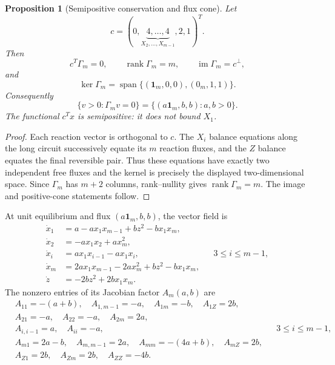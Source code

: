 \documentclass[11pt]{article}
\newtheorem{proposition}[theorem]{Proposition}
\theoremstyle{definition}
\newcommand{\im}{\operatorname{im}}
\newcommand{\rank}{\operatorname{rank}}
\newcommand{\1}{\mathbf 1}
\begin{document}
\begin{proposition}[Semipositive conservation and flux cone]\label{prop:flux}
Let
\begin{equation}\label{eq:cvec}
 c=(0,\underbrace{4,\ldots,4}_{X_2,\ldots,X_{m-1}},2,1)^T.
\end{equation}
Then
\begin{equation}\label{eq:rank-kernel}
 c^T\Gamma_m=0,\qquad \rank\Gamma_m=m,\qquad
 \im\Gamma_m=c^\perp,
\end{equation}
and
\begin{equation}\label{eq:kerGamma}
 \ker\Gamma_m=
 \operatorname{span}\{(\1_m,0,0),(0_m,1,1)\}.
\end{equation}
Consequently
\begin{equation}\label{eq:fluxcone}
 \{v>0:\Gamma_mv=0\}=\{(a\1_m,b,b):a,b>0\}.
\end{equation}
The functional $c^Tx$ is semipositive: it does not bound $X_1$.
\end{proposition}

\begin{proof}
Each reaction vector is orthogonal to $c$.  The $X_i$ balance equations along
the long circuit successively equate its $m$ reaction fluxes, and the $Z$
balance equates the final reversible pair.  Thus these equations have exactly
two independent free fluxes and the kernel is precisely the displayed
two-dimensional space.  Since $\Gamma_m$ has $m+2$ columns, rank--nullity gives
$\rank\Gamma_m=m$.  The image and positive-cone statements follow.
\end{proof}

At unit equilibrium and flux $(a\1_m,b,b)$, the vector field is
\begin{align}
\dot x_1&=a-a x_1x_{m-1}+bz^2-bx_1x_m,\nonumber\\
\dot x_2&=-a x_1x_2+a x_m^2,\nonumber\\
\dot x_i&=a x_1x_{i-1}-a x_1x_i,&&3\le i\le m-1,\label{eq:ode}\\
\dot x_m&=2a x_1x_{m-1}-2a x_m^2+bz^2-bx_1x_m,\nonumber\\
\dot z&=-2bz^2+2bx_1x_m.\nonumber
\end{align}
The nonzero entries of its Jacobian factor $A_m(a,b)$ are
\begin{align}
&A_{11}=-(a+b),\quad A_{1,m-1}=-a,\quad A_{1m}=-b,\quad A_{1Z}=2b,\nonumber\\
&A_{21}=-a,\quad A_{22}=-a,\quad A_{2m}=2a,\nonumber\\
&A_{i,i-1}=a,\quad A_{ii}=-a,&&3\le i\le m-1,\label{eq:Apattern}\\
&A_{m1}=2a-b,\quad A_{m,m-1}=2a,\quad A_{mm}=-(4a+b),\quad A_{mZ}=2b,\nonumber\\
&A_{Z1}=2b,\quad A_{Zm}=2b,\quad A_{ZZ}=-4b.\nonumber
\end{align}
\end{document}
